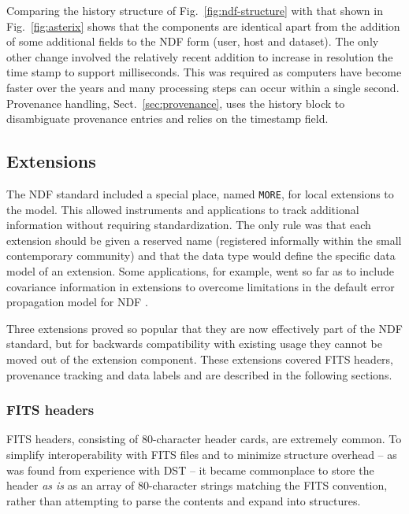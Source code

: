 \documentclass[final,authoryear,5p,times,twocolumn]{elsarticle}
\newcommand*\secref[1]{Sect.~\ref{#1}}
\begin{document}
Comparing the history structure of Fig.~\ref{fig:ndf-structure} with that shown in Fig.~\ref{fig:asterix}
shows that the components are identical apart from the addition of
some additional fields to the NDF form (user, host and dataset).
The only other change involved the relatively recent addition to increase in resolution the time
stamp to support milliseconds. This was required as computers have
become faster over the years and many processing steps can occur
within a single second. Provenance handling, \secref{sec:provenance},
uses the history block to disambiguate provenance entries and relies
on the timestamp field.

\subsection{Extensions}
\label{sec:more}

The NDF standard included a special place, named \texttt{MORE}, for local extensions to the
model. This allowed instruments and applications to track additional
information without requiring standardization. The only rule was that
each extension should be given a reserved name (registered informally within the
  small contemporary community) and that the data type
would define the specific data model of an extension.
Some
applications, for example, went so far as to include covariance
information in extensions to overcome limitations in the default error
propagation model for NDF \citep[for example \specdre;][]{SUN140}.

Three extensions proved so popular that they are now effectively part of the NDF
standard, but for backwards compatibility with existing usage they
cannot be moved out of the extension component. These extensions
covered FITS headers, provenance tracking and data labels and are
described in the following sections.

\subsubsection{FITS headers}

FITS headers, consisting of 80-character header cards, are extremely
common.  To simplify interoperability with FITS files and to
minimize structure overhead -- as was found from experience with DST --
it became commonplace to store the header \emph{as is}
as an array of 80-character strings matching the FITS
convention, rather than attempting to parse the contents and expand
into structures.
\end{document}
